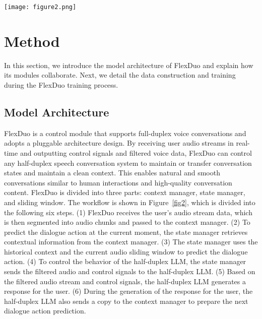 \documentclass[11pt]{article}
\begin{document}
\begin{figure*}[t]
  \texttt{[image: figure2.png]}
  \caption {FlexDuo Workflow and Framework for Interaction with half-duplex LLMs. The input to FlexDuo is user audio and the conversational responses from a half-duplex LLM, while its outputs are control signals and filtered user audio.}
    \label{fig2}
\end{figure*}


\section{Method}
In this section, we introduce the model architecture of FlexDuo and explain how its modules collaborate. Next, we detail the data construction and training during the FlexDuo training process.
\subsection{Model Architecture}
FlexDuo is a control module that supports full-duplex voice conversations and adopts a pluggable architecture design. By receiving user audio streams in real-time and outputting control signals and filtered voice data, FlexDuo can control any half-duplex speech conversation system to maintain or transfer conversation states and maintain a clean context. This enables natural and smooth conversations similar to human interactions and high-quality conversation content. FlexDuo is divided into three parts: context manager, state manager, and sliding window. The workflow is shown in Figure~\ref{fig2}, which is divided into the following six steps. (1) FlexDuo receives the user's audio stream data, which is then segmented into audio chunks and passed to the context manager. (2) To predict the dialogue action at the current moment, the state manager retrieves contextual information from the context manager. (3) The state manager uses the historical context and the current audio sliding window to predict the dialogue action. (4) To control the behavior of the half-duplex LLM, the state manager sends the filtered audio and control signals to the half-duplex LLM. (5) Based on the filtered audio stream and control signals, the half-duplex LLM generates a response for the user. (6) During the generation of the response for the user, the half-duplex LLM also sends a copy to the context manager to prepare the next dialogue action prediction.
\end{document}
